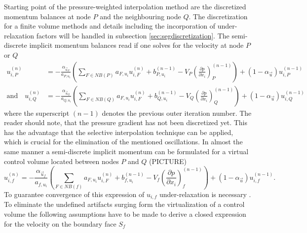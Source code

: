   Starting point of the pressure-weighted interpolation method are the discretized momentum balances at node \(P\) and the neighbouring node \(Q\). The discretization for a finite volume methods and details including the incorporation of under-relaxation factors will be handled in subsection \ref{sec:segdiscretization}. The semi-discrete implicit momentum balances read if one solves for the velocity at node \(P\) or \(Q\)
  \begin{subequations}
  \begin{align}
    u_{i,P}^{(n)} 
    &= 
    - \frac{\alpha_{\vec{u}_P}}{a_{P,u_i}} \left(\sum_{F \in NB(P)} a_{F,u_i} u_{i,F}^{(n)}
    +                                     b_{P,u_i}^{(n-1)} 
    -                                     V_P\left(\frac{\partial p}{\partial x_i}\right)_P^{(n-1)} \right)
    + \left(1 - \alpha_{\vec{u}}\right) u_{i,P}^{(n-1)}  \\[1em]
    \text{and} \quad
    u_{i,Q}^{(n)} 
    &= 
    - \frac{\alpha_{\vec{u}_Q}}{a_{Q,u_i}} \left(\sum_{F \in NB(Q)} a_{F,u_i} u_{i,F}^{(n)}
    +                                     b_{Q,u_i}^{(n-1)} 
    -                                     V_Q\left(\frac{\partial p}{\partial x_i}\right)_Q^{(n-1)}   \right)
    + \left(1 - \alpha_{\vec{u}}\right) u_{i,Q}^{(n-1)}
  \end{align}
  \end{subequations}
  where the superscript \((n-1)\) denotes the previous outer iteration number. The reader should note, that the pressure gradient has not been discretized yet. This has the advantage that the selective interpolation technique \cite{schaefer99} can be applied, which is crucial for the elimination of the mentioned oscillations. In almost the same manner a semi-discrete implicit momentum can be formulated for a virtual control volume located between nodes \(P\) and \(Q\) (PICTURE)
  \begin{equation}
    \label{eq:virtualu}
    u_{i,f}^{(n)} 
    = 
    - \frac{\alpha_{\vec{u}_f}}{a_{f,u_i}} \left(\sum_{F \in NB(f)} a_{F,u_i} u_{i,F}^{(n)} 
    +                                     b_{f,u_i}^{(n-1)} 
    -                                     V_f\left(\frac{\partial p}{\partial x_i}\right)_f^{(n-1)}  \right)
    + \left(1 - \alpha_{\vec{u}}\right) u_{i,f}^{(n-1)}.
  \end{equation}
  To guarantee convergence of this expression of \(u_{i,f}\) under-relaxation is necessary \cite{majumdar88}. To eliminate the undefined artifacts surging form the virtualization of a control volume the following assumptions have to be made to derive a closed expression for the velocity on the boundary face \(S_f\)
